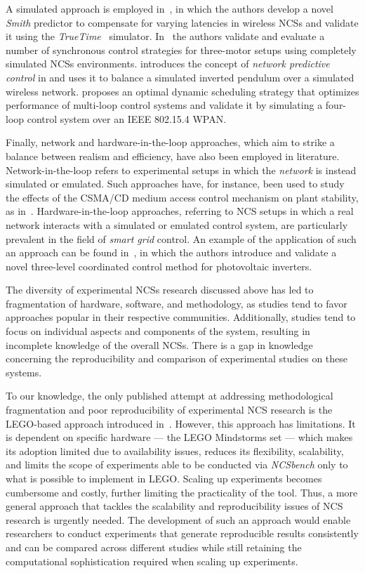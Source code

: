 A simulated approach is employed in~\cite{du2009novel}, in which the authors develop a novel \emph{Smith} predictor to compensate for varying latencies in wireless \glspl{NCS} and validate it using the \emph{TrueTime}~\cite{henriksson2002truetime} simulator.
In~\cite{chen2015synchronous} the authors validate and evaluate a number of synchronous control strategies for three-motor setups using completely simulated \glspl{NCS} environments.\@
\cite{wu2012application} introduces the concept of \emph{network predictive control} in and uses it to balance a simulated inverted pendulum over a simulated wireless network.\@
\cite{ma2019optimal} proposes an optimal dynamic scheduling strategy that optimizes performance of multi-loop control systems and validate it by simulating a four-loop control system over an \acs{IEEE} 802.15.4 \gls{WPAN}.

Finally, network and hardware-in-the-loop approaches, which aim to strike a balance between realism and efficiency, have also been employed in literature.
Network-in-the-loop refers to experimental setups in which the \emph{network} is instead simulated or emulated.
Such approaches have, for instance, been used to study the effects of the \gls{CSMA/CD} medium access control mechanism on plant stability, as in~\cite{natale2004inverted}.
Hardware-in-the-loop approaches, referring to \gls{NCS} setups in which a real network interacts with a simulated or emulated control system, are particularly prevalent in the field of \emph{smart grid} control.
An example of the application of such an approach can be found in~\cite{wang2020inverter}, in which the authors introduce and validate a novel three-level coordinated control method for photovoltaic inverters.

\medskip

The diversity of experimental \glspl{NCS} research discussed above has led to fragmentation of hardware, software, and methodology, as studies tend to favor approaches popular in their respective communities.
Additionally, studies tend to focus on individual aspects and components of the system, resulting in incomplete knowledge of the overall \glspl{NCS}.
There is a gap in knowledge concerning the reproducibility and comparison of experimental studies on these systems.

To our knowledge, the only published attempt at addressing methodological fragmentation and poor reproducibility of experimental \gls{NCS} research is the LEGO-based approach introduced in~\cite{zoppi2020ncsbench}.
However, this approach has limitations.
It is dependent on specific hardware --- the LEGO Mindstorms set --- which makes its adoption limited due to availability issues, reduces its flexibility, scalability, and limits the scope of experiments able to be conducted via \emph{NCSbench} only to what is possible to implement in LEGO.\@
Scaling up experiments becomes cumbersome and costly, further limiting the practicality of the tool.
Thus, a more general approach that tackles the scalability and reproducibility issues of NCS research is urgently needed.
The development of such an approach would enable researchers to conduct experiments that generate reproducible results consistently and can be compared across different studies while still retaining the computational sophistication required when scaling up experiments.